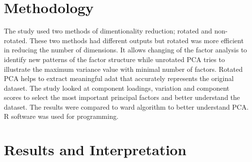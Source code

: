 \documentclass[12pt,a4paper]{article}
\begin{document}
\section{Methodology}
The study used two methods of dimentionality reduction; rotated and non-rotated. These two methods had different outputs but rotated was more efficient in reducing the number of dimensions. It allows changing of the factor analysis to identify new patterns of the factor structure while unrotated PCA tries to illustrate the maximum variance value with minimal number of factors. Rotated PCA helps to extract meaningful adat that accurately represents the original dataset. The study looked at component loadings, variation and component scores to select the most important principal factors and better understand the dataset. The results were compared to ward algorithm to better understand PCA. R software was used for programming.

\section{Results and Interpretation}
\end{document}
